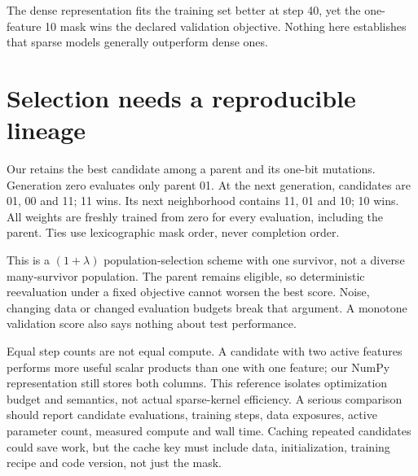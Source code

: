 \begin{center}\end{center}

The dense representation fits the training set better at step 40, yet the
one-feature 10 mask wins the declared validation objective. Nothing here
establishes that sparse models generally outperform dense ones.

\section{Selection needs a reproducible lineage}
Our  retains the best candidate among a parent and
its one-bit mutations. Generation zero evaluates only parent 01.
At the next generation, candidates are 01, 00 and 11; 11 wins.
Its next neighborhood contains 11, 01 and 10; 10 wins.
All weights are freshly trained from zero for every evaluation, including
the parent. Ties use lexicographic mask order, never completion order.


\begin{center}\end{center}

This is a $(1+\lambda)$ population-selection scheme with one survivor,
not a diverse many-survivor population. The parent remains eligible,
so deterministic reevaluation under a fixed objective cannot worsen the
best score. Noise, changing data or changed evaluation budgets break that
argument. A monotone validation score also says nothing about test
performance.

Equal step counts are not equal compute. A candidate with two active
features performs more useful scalar products than one with one feature;
our NumPy representation still stores both columns. This reference isolates
optimization budget and semantics, not actual sparse-kernel efficiency.
A serious comparison should report candidate evaluations, training steps,
data exposures, active parameter count, measured compute and wall time.
Caching repeated candidates could save work, but the cache key must include
data, initialization, training recipe and code version, not just the mask.

